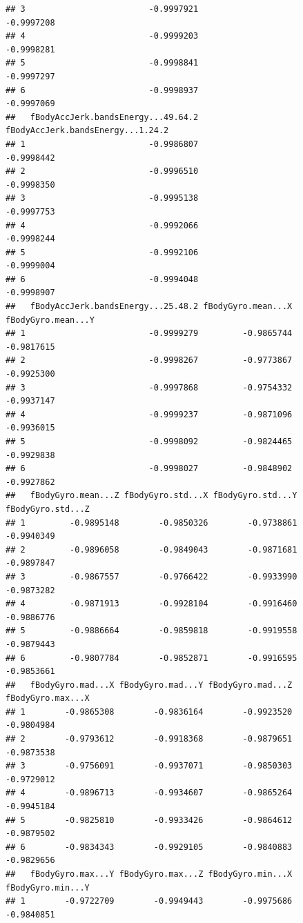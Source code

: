 \documentclass[
]{article}
\begin{document}
\begin{verbatim}
## 3                         -0.9997921                         -0.9997208
## 4                         -0.9999203                         -0.9998281
## 5                         -0.9998841                         -0.9997297
## 6                         -0.9998937                         -0.9997069
##   fBodyAccJerk.bandsEnergy...49.64.2 fBodyAccJerk.bandsEnergy...1.24.2
## 1                         -0.9986807                        -0.9998442
## 2                         -0.9996510                        -0.9998350
## 3                         -0.9995138                        -0.9997753
## 4                         -0.9992066                        -0.9998244
## 5                         -0.9992106                        -0.9999004
## 6                         -0.9994048                        -0.9998907
##   fBodyAccJerk.bandsEnergy...25.48.2 fBodyGyro.mean...X fBodyGyro.mean...Y
## 1                         -0.9999279         -0.9865744         -0.9817615
## 2                         -0.9998267         -0.9773867         -0.9925300
## 3                         -0.9997868         -0.9754332         -0.9937147
## 4                         -0.9999237         -0.9871096         -0.9936015
## 5                         -0.9998092         -0.9824465         -0.9929838
## 6                         -0.9998027         -0.9848902         -0.9927862
##   fBodyGyro.mean...Z fBodyGyro.std...X fBodyGyro.std...Y fBodyGyro.std...Z
## 1         -0.9895148        -0.9850326        -0.9738861        -0.9940349
## 2         -0.9896058        -0.9849043        -0.9871681        -0.9897847
## 3         -0.9867557        -0.9766422        -0.9933990        -0.9873282
## 4         -0.9871913        -0.9928104        -0.9916460        -0.9886776
## 5         -0.9886664        -0.9859818        -0.9919558        -0.9879443
## 6         -0.9807784        -0.9852871        -0.9916595        -0.9853661
##   fBodyGyro.mad...X fBodyGyro.mad...Y fBodyGyro.mad...Z fBodyGyro.max...X
## 1        -0.9865308        -0.9836164        -0.9923520        -0.9804984
## 2        -0.9793612        -0.9918368        -0.9879651        -0.9873538
## 3        -0.9756091        -0.9937071        -0.9850303        -0.9729012
## 4        -0.9896713        -0.9934607        -0.9865264        -0.9945184
## 5        -0.9825810        -0.9933426        -0.9864612        -0.9879502
## 6        -0.9834343        -0.9929105        -0.9840883        -0.9829656
##   fBodyGyro.max...Y fBodyGyro.max...Z fBodyGyro.min...X fBodyGyro.min...Y
## 1        -0.9722709        -0.9949443        -0.9975686        -0.9840851

\end{verbatim}
\end{document}
